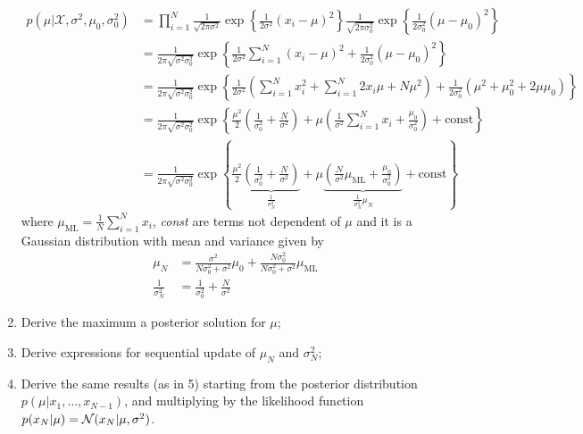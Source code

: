 \documentclass{amsmlaj}
\begin{document}
\begin{problem}
\begin{enumerate}
	\begin{equation}
		\begin{split}
		p(\mu|\mathcal{X},\sigma^2, \mu_0,\sigma_0^2)
		&=\prod_{i=1}^{N}\frac{1}{\sqrt{2\pi\sigma^2}}\exp\left\{ \frac{1}{2\sigma^2}(x_i-\mu)^2
		\right\} \frac{1}{\sqrt{2\pi\sigma_0^2}}\exp\left\{
		\frac{1}{2\sigma_0^2}(\mu-\mu_0)^2 \right\} \\
		&=\frac{1}{2\pi\sqrt{\sigma^2\sigma_0^2}}\exp\left\{
			\frac{1}{2\sigma^2}\sum_{i=1}^N (x_i-\mu)^2
			+\frac{1}{2\sigma_0^2}(\mu-\mu_0)^2
		\right\} \\
		&=\frac{1}{2\pi\sqrt{\sigma^2\sigma_0^2}}\exp\left\{
			\frac{1}{2\sigma^2}\left(
			\sum_{i=1}^N x_i^2 + \sum_{i=1}^N 2x_i\mu + N\mu^2
			\right) +
			\frac{1}{2\sigma_0^2} (\mu^2 + \mu_0^2 + 2\mu\mu_0)
		\right\} \\
		&=\frac{1}{2\pi\sqrt{\sigma^2\sigma_0^2}}\exp\left\{ 
			\frac{\mu^2}{2}\left( \frac{1}{\sigma_0^2}+\frac{N}{\sigma^2} \right) +
			\mu\left( 
			\frac{1}{\sigma^2}\sum_{i=1}^N x_i +
			\frac{\mu_0}{\sigma_0^2}
			\right) + \text{const}
		\right\} \\
		&=\frac{1}{2\pi\sqrt{\sigma^2\sigma_0^2}}\exp\left\{ 
			\frac{\mu^2}{2}\underbrace{\left(
				\frac{1}{\sigma_0^2}+\frac{N}{\sigma^2}
			\right)}_{\frac{1}{\sigma_N^2}} +
			\mu\underbrace{\left( 
			\frac{N}{\sigma^2} \mu_\text{ML} +
			\frac{\mu_0}{\sigma_0^2}
			\right)}_{\frac{1}{\sigma_N^2}\mu_N} + \text{const}
		\right\}
		\end{split}
	\end{equation}
	where $\mu_\text{ML}=\frac{1}{N}\sum_{i=1}^N x_i$, \textit{const} are terms
	not dependent of $\mu$ and it is a Gaussian
	distribution with mean and variance given by
	\begin{equation}
		\begin{split}
			\mu_N&=\frac{\sigma^2}{N\sigma_0^2+\sigma^2}\mu_0  +
				\frac{N\sigma_0^2}{N\sigma_0^2+\sigma^2}\mu_\text{ML} \\
			\frac{1}{\sigma_N^2}&=\frac{1}{\sigma_0^2}+\frac{N}{\sigma^2}
		\end{split}
	\end{equation}

\item Derive the maximum a posterior solution for $\mu$;
\item Derive expressions for sequential update of $\mu_N$ and
				$\sigma_N^2$;
\item Derive the same results (as in 5) starting from the
				posterior distribution $p(\mu|x_1,\dots,x_{N-1})$, and
				multiplying by the likelihood function $p(x_N |\mu) =
				\mathcal{N}(x_N |\mu,\sigma^2)$.
\end{enumerate}
\end{problem}
\end{document}
